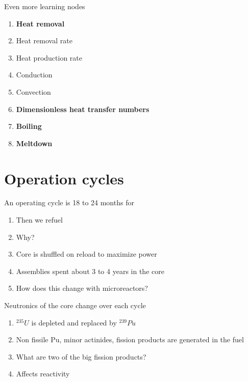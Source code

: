 \documentclass[aspectratio=1610,pdftex,dvipsnames,compress,xcolor={dvipsnames}]{beamer}
\newcommand{\acsp}{\acrshortpl} %
\begin{document}
\begin{frame}{Even more learning nodes}
    \begin{enumerate}[series=outerlist,topsep=0pt,itemsep=1pt,leftmargin=*,label=(\arabic*)]
                \item[]\textbf{Heat removal}
                \item[]Heat removal rate
                \item[]Heat production rate
                \item[]Conduction
                \item[]Convection
                    \vspace{0.15in}
                \item[]\textbf{Dimensionless heat transfer numbers}
                    \vspace{0.15in}
                \item[]\textbf{Boiling}
                    \vspace{0.15in}
                \item[]\textbf{Meltdown}
    \end{enumerate}
\end{frame}


\section{Operation cycles}


\addtocounter{framenumber}{-1} 
\begin{frame}{An operating cycle is 18 to 24 months for \acsp{lwr}}
    \begin{enumerate}[series=outerlist,topsep=0pt,itemsep=21pt,leftmargin=*,label=(\arabic*)]
        \item[]Then we refuel
        \item[]Why?
        \item[]Core is shuffled on reload to maximize power
        \item[]Assemblies spent about 3 to 4 years in the core
        \item[]How does this change with microreactors?
    \end{enumerate}
\end{frame}


\begin{frame}{Neutronics of the core change over each cycle}
    \begin{enumerate}[series=outerlist,topsep=0pt,itemsep=21pt,leftmargin=*,label=(\arabic*)]
        \item[]$^{235}U$ is depleted and replaced by $^{239}Pu$
        \item[]Non fissile Pu, minor actinides, fission products are generated in the fuel
        \item[]What are two of the big fission products?
        \item[]Affects reactivity
    \end{enumerate}
\end{frame}
\end{document}
